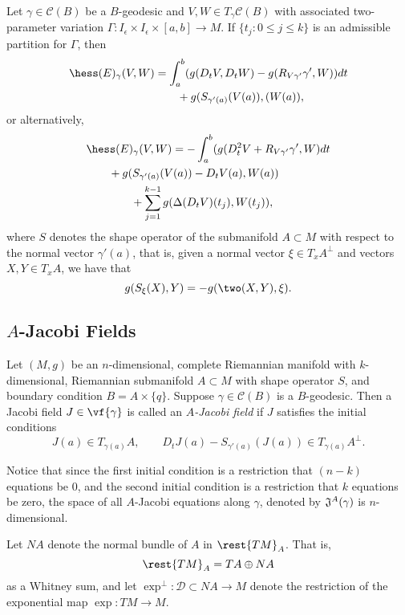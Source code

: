 \begin{thm}
	Let $\gamma\in\mathcal{C}(B)$ be a $B$-geodesic and $V,W\in T_\gamma\mathcal{C}(B)$ with associated two-parameter variation $\Gamma:I_\epsilon\times I_\epsilon\times[a,b]\to M$.  If $\{t_j:0\leq j\leq k\}$ is an admissible partition for $\Gamma$, then
	\begin{align*}
		\hess(E)_\gamma(V,W)&=\int_a^b(g(D_tV,D_tW)-g(R_{V\gamma'}\gamma',W))dt\\
		&\qquad +g(S_{\gamma'(a)}(V(a)),(W(a)),
	\end{align*}
	or alternatively,
	\begin{align*}
		&\hess(E)_\gamma(V,W)=-\int_a^b(g(D_t^2V+R_{V\gamma'}\gamma',W)dt\\
		&\qquad +g(S_{\gamma'(a)}(V(a))-D_tV(a),W(a))\\
		&\qquad\qquad +\sum_{j=1}^{k-1}g(\Delta(D_tV)(t_j),W(t_j)),
	\end{align*}
	where $S$ denotes the shape operator of the submanifold $A\subset M$ with respect to the normal vector $\gamma'(a)$, that is, given a normal vector $\xi\in T_xA^\perp$ and vectors $X,Y\in T_xA$, we have that
	$$g(S_\xi(X),Y)=-g(\two(X,Y),\xi).$$
\end{thm}



\subsection{$A$-Jacobi Fields}

Let $(M,g)$ be an $n$-dimensional, complete Riemannian manifold with $k$-dimensional, Riemannian submanifold $A\subset M$ with shape operator $S$, and boundary condition $B=A\times\{q\}$.  Suppose $\gamma\in\mathcal{C}(B)$ is a $B$-geodesic.  Then a Jacobi field $J\in\vf{\gamma}$ is called an \textit{$A$-Jacobi field} if $J$ satisfies the initial conditions
$$J(a)\in T_{\gamma(a)}A,\qquad D_tJ(a)-S_{\gamma'(a)}(J(a))\in T_{\gamma(a)}A^\perp.$$

Notice that since the first initial condition is a restriction that $(n-k)$ equations be $0$, and the second initial condition is a restriction that $k$ equations be zero, the space of all $A$-Jacobi equations along $\gamma$, denoted by $\frak{J}^A(\gamma)$ is $n$-dimensional.

Let $NA$ denote the normal bundle of $A$ in $\rest{TM}_A$.  That is,
$$\rest{TM}_A=TA\oplus NA$$
as a Whitney sum, and let $\exp^\perp:\mathcal{D}\subset NA\to M$ denote the restriction of the exponential map $\exp:TM\to M$.

